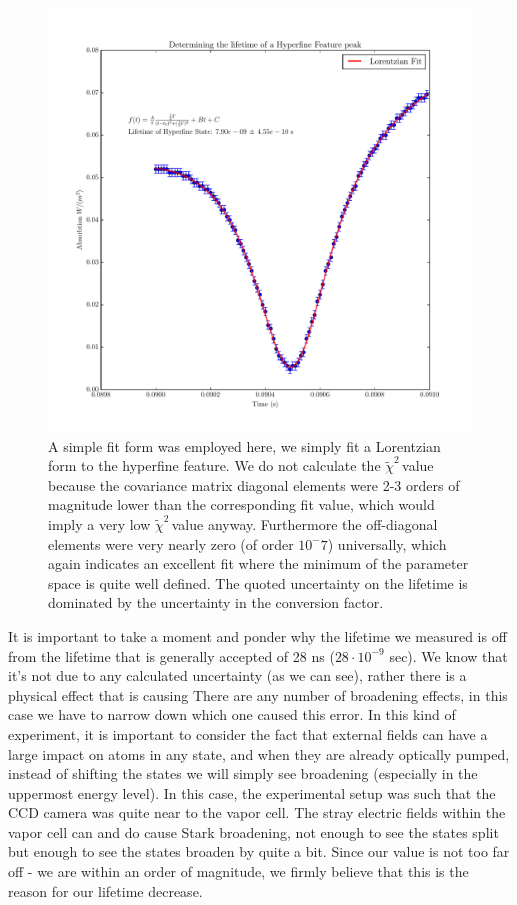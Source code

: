 \documentclass{article}
\newcommand{\redchi}{$\tilde{\chi}^2\,$}
\begin{document}
  \begin{figure}[!htb]
    \centering
    \includegraphics[scale=.75]{../plots/rb87_hyperfine.pdf}
    \caption{A simple fit form was employed here, we simply fit a Lorentzian form to the hyperfine feature.  We do not calculate the \redchi value because the covariance matrix diagonal elements were 2-3 orders of magnitude lower than the corresponding fit value, which would imply a very low \redchi value anyway.  Furthermore the off-diagonal elements were very nearly zero (of order $10^-7$) universally, which again indicates an excellent fit where the minimum of the parameter space is quite well defined.  The quoted uncertainty on the lifetime is dominated by the uncertainty in the conversion factor.}
    \label{lifetime}
  \end{figure}

  It is important to take a moment and ponder why the lifetime we measured is off from the lifetime that is generally accepted of 28 ns ($28\cdot10^{-9}$ sec).  We know that it's not due to any calculated uncertainty (as we can see), rather there is a physical effect that is causing   There are any number of broadening effects, in this case we have to narrow down which one caused this error.  In this kind of experiment, it is important to consider the fact that external fields can have a large impact on atoms in any state, and when they are already optically pumped, instead of shifting the states we will simply see broadening (especially in the uppermost energy level).  In this case, the experimental setup was such that the CCD camera was quite near to the vapor cell.  The stray electric fields within the vapor cell can and do cause Stark broadening, not enough to see the states split but enough to see the states broaden by quite a bit.  Since our value is not too far off - we are within an order of magnitude, we firmly believe that this is the reason for our lifetime decrease.
\end{document}

